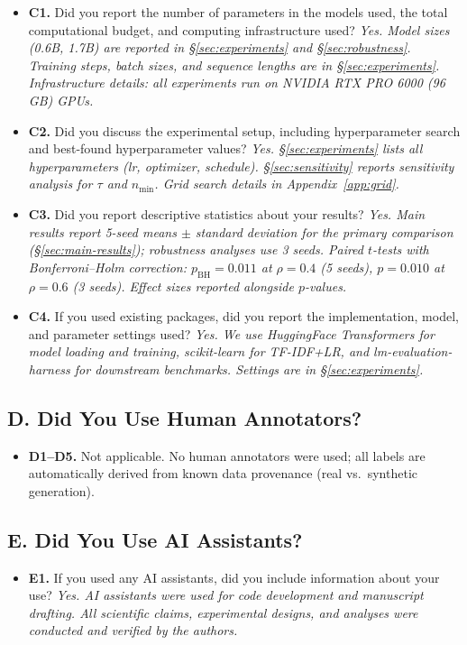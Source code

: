 \begin{itemize}[nosep,leftmargin=*]
\item[\checkmark] \textbf{C1.} Did you report the number of parameters in the models used, the total computational budget, and computing infrastructure used?
\textit{Yes. Model sizes (0.6B, 1.7B) are reported in \S\ref{sec:experiments} and \S\ref{sec:robustness}. Training steps, batch sizes, and sequence lengths are in \S\ref{sec:experiments}. Infrastructure details: all experiments run on NVIDIA RTX PRO 6000 (96\,GB) GPUs.}

\item[\checkmark] \textbf{C2.} Did you discuss the experimental setup, including hyperparameter search and best-found hyperparameter values?
\textit{Yes. \S\ref{sec:experiments} lists all hyperparameters (lr, optimizer, schedule). \S\ref{sec:sensitivity} reports sensitivity analysis for $\tau$ and $n_{\min}$. Grid search details in Appendix~\ref{app:grid}.}

\item[\checkmark] \textbf{C3.} Did you report descriptive statistics about your results?
\textit{Yes. Main results report 5-seed means $\pm$ standard deviation for the primary comparison (\S\ref{sec:main-results}); robustness analyses use 3 seeds. Paired $t$-tests with Bonferroni--Holm correction: $p_{\mathrm{BH}}{=}0.011$ at $\rho{=}0.4$ (5 seeds), $p{=}0.010$ at $\rho{=}0.6$ (3 seeds). Effect sizes reported alongside $p$-values.}

\item[\checkmark] \textbf{C4.} If you used existing packages, did you report the implementation, model, and parameter settings used?
\textit{Yes. We use HuggingFace Transformers for model loading and training, scikit-learn for TF-IDF+LR, and lm-evaluation-harness for downstream benchmarks. Settings are in \S\ref{sec:experiments}.}
\end{itemize}

\subsection*{D. Did You Use Human Annotators?}

\begin{itemize}[nosep,leftmargin=*]
\item[] \textbf{D1--D5.} Not applicable. No human annotators were used; all labels are automatically derived from known data provenance (real vs.\ synthetic generation).
\end{itemize}

\subsection*{E. Did You Use AI Assistants?}

\begin{itemize}[nosep,leftmargin=*]
\item[\checkmark] \textbf{E1.} If you used any AI assistants, did you include information about your use?
\textit{Yes. AI assistants were used for code development and manuscript drafting. All scientific claims, experimental designs, and analyses were conducted and verified by the authors.}
\end{itemize}
